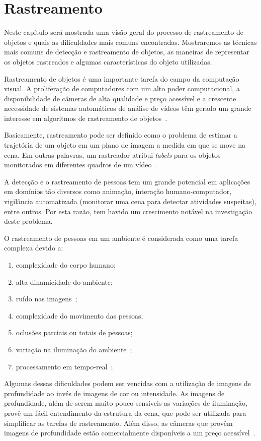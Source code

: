 \chapter {Rastreamento}	

	Neste capítulo será mostrada uma visão geral do processo de rastreamento de objetos e quais as dificuldades mais comuns encontradas. Mostraremos as técnicas mais comuns de detecção e rastreamento de objetos, as maneiras de representar os objetos rastreados e algumas características do objeto utilizadas.

	Rastreamento de objetos é uma importante tarefa do campo da computação visual. A proliferação de computadores com um alto poder computacional, a disponibilidade de câmeras de alta qualidade e preço acessível e a crescente necessidade de sistemas automáticos de análise de vídeos têm gerado um grande interesse em algoritmos de rastreamento de objetos~\cite{yilmaz}.

	Basicamente, rastreamento pode ser definido como o problema de estimar a trajetória de um objeto em um plano de imagem a medida em que se move na cena. Em outras palavras, um rastreador atribui \textit{labels} para os objetos monitorados em diferentes quadros de um vídeo~\cite{yilmaz}.

	A detecção e o rastreamento de pessoas tem um grande potencial em aplicações em domínios tão diversos como animação, interação humano-computador, vigilância automatizada (monitorar uma cena para detectar atividades suspeitas), entre outros. Por esta razão, tem havido um crescimento notável na investigação deste problema.

	O rastreamento de pessoas em um ambiente é considerada como uma tarefa complexa devido a:

		\begin{enumerate}
			\item complexidade do corpo humano;
			\item alta dinamicidade do ambiente;
			\item ruído nas imagens~\cite{yilmaz};
			\item complexidade do movimento das pessoas;
			\item oclusões parciais ou totais de pessoas;
			\item variação na iluminação do ambiente~\cite{yilmaz};
			\item processamento em tempo-real~\cite{yilmaz};
		\end{enumerate}

	Algumas dessas dificuldades podem ser vencidas com a utilização de imagens de profundidade ao invés de imagens de cor ou intensidade. As imagens de profundidade, além de serem muito pouco sensíveis as variações de iluminação, provê um fácil entendimento da estrutura da cena, que pode ser utilizada para simplificar as tarefas de rastreamento. Além disso, as câmeras que provêm imagens de profundidade estão comercialmente disponíveis a um preço acessível~\cite{nikos}.

